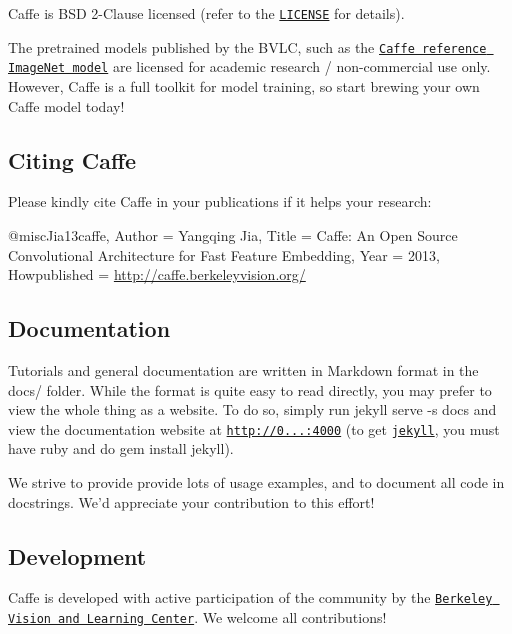 Caffe is B\+S\+D 2-\/\+Clause licensed (refer to the \href{http://caffe.berkeleyvision.org/license.html}{\tt L\+I\+C\+E\+N\+S\+E} for details).

The pretrained models published by the B\+V\+L\+C, such as the \href{https://www.dropbox.com/s/n3jups0gr7uj0dv/caffe_reference_imagenet_model}{\tt Caffe reference Image\+Net model} are licensed for academic research / non-\/commercial use only. However, Caffe is a full toolkit for model training, so start brewing your own Caffe model today!

\subsection*{Citing Caffe}

Please kindly cite Caffe in your publications if it helps your research\+: \begin{DoxyVerb}@misc{Jia13caffe,
  Author = {Yangqing Jia},
  Title = { {Caffe}: An Open Source Convolutional Architecture for Fast Feature Embedding},
  Year  = {2013},
  Howpublished = {\url{http://caffe.berkeleyvision.org/}}
}
\end{DoxyVerb}


\subsection*{Documentation}

Tutorials and general documentation are written in Markdown format in the {\ttfamily docs/} folder. While the format is quite easy to read directly, you may prefer to view the whole thing as a website. To do so, simply run {\ttfamily jekyll serve -\/s docs} and view the documentation website at {\ttfamily \href{http://0.0.0.0:4000}{\tt http\+://0...\+:4000}} (to get \href{http://jekyllrb.com/}{\tt jekyll}, you must have ruby and do {\ttfamily gem install jekyll}).

We strive to provide provide lots of usage examples, and to document all code in docstrings. We'd appreciate your contribution to this effort!

\subsection*{Development}

Caffe is developed with active participation of the community by the \href{http://bvlc.eecs.berkeley.edu/}{\tt Berkeley Vision and Learning Center}. We welcome all contributions!

